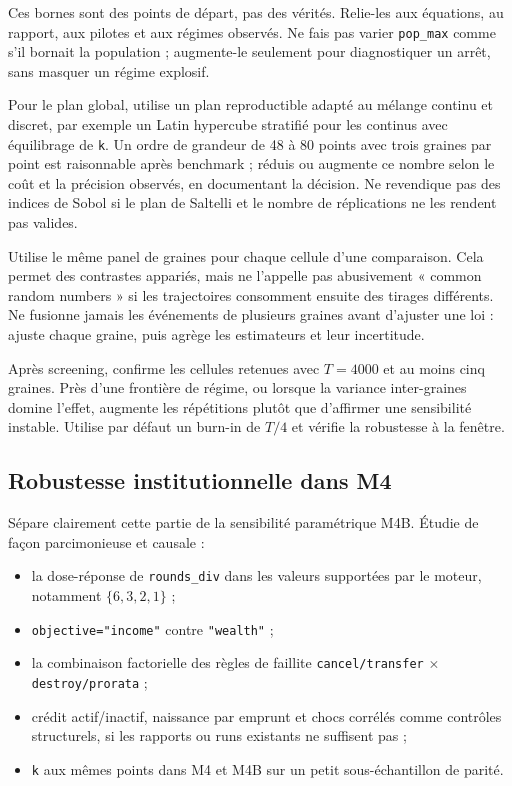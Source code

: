 \documentclass[11pt,a4paper]{article}
\newcommand{\code}[1]{\texttt{\color{navy}#1}}
\begin{document}
Ces bornes sont des points de départ, pas des vérités. Relie-les aux équations,
au rapport, aux pilotes et aux régimes observés. Ne fais pas varier
\code{pop\_max} comme s'il bornait la population ; augmente-le seulement pour
diagnostiquer un arrêt, sans masquer un régime explosif.

Pour le plan global, utilise un plan reproductible adapté au mélange continu
et discret, par exemple un Latin hypercube stratifié pour les continus avec
équilibrage de \code{k}. Un ordre de grandeur de 48 à 80 points avec trois
graines par point est raisonnable après benchmark ; réduis ou augmente ce
nombre selon le coût et la précision observés, en documentant la décision. Ne
revendique pas des indices de Sobol si le plan de Saltelli et le nombre de
réplications ne les rendent pas valides.

Utilise le même panel de graines pour chaque cellule d'une comparaison. Cela
permet des contrastes appariés, mais ne l'appelle pas abusivement « common
random numbers » si les trajectoires consomment ensuite des tirages différents.
Ne fusionne jamais les événements de plusieurs graines avant d'ajuster une
loi : ajuste chaque graine, puis agrège les estimateurs et leur incertitude.

Après screening, confirme les cellules retenues avec $T=4000$ et au moins cinq
graines. Près d'une frontière de régime, ou lorsque la variance inter-graines
domine l'effet, augmente les répétitions plutôt que d'affirmer une sensibilité
instable. Utilise par défaut un burn-in de $T/4$ et vérifie la robustesse à la
fenêtre.

\subsection{Robustesse institutionnelle dans M4}

Sépare clairement cette partie de la sensibilité paramétrique M4B. Étudie de
façon parcimonieuse et causale :

\begin{itemize}
  \item la dose-réponse de \code{rounds\_div} dans les valeurs supportées par
    le moteur, notamment $\{6,3,2,1\}$ ;
  \item \code{objective="income"} contre \code{"wealth"} ;
  \item la combinaison factorielle des règles de faillite
    \code{cancel/transfer} $\times$ \code{destroy/prorata} ;
  \item crédit actif/inactif, naissance par emprunt et chocs corrélés comme
    contrôles structurels, si les rapports ou runs existants ne suffisent pas ;
  \item \code{k} aux mêmes points dans M4 et M4B sur un petit sous-échantillon
    de parité.
\end{itemize}
\end{document}
